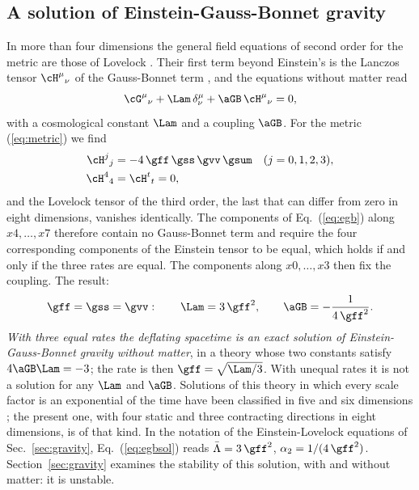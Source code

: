 \subsection{A solution of Einstein-Gauss-Bonnet gravity}
\label{sec:egb}

In more than four dimensions the general field equations of second order for the metric are those of
Lovelock \cite{Lovelock1971}. Their first term beyond Einstein's is the Lanczos tensor
$\cH^{\mu}{}_{\nu}$ of the Gauss-Bonnet term \cite{BoulwareDeser1985}, and the equations without
matter read
\begin{equation}
\cG^{\mu}{}_{\nu}+\Lam\,\delta^{\mu}_{\nu}+\aGB\,\cH^{\mu}{}_{\nu}=0,
\label{eq:egb}
\end{equation}
with a cosmological constant $\Lam$ and a coupling $\aGB$. For the metric
(\ref{eq:metric}) we find
\begin{equation}
\begin{aligned}
\cH^{j}{}_{j}&=-4\,\gff\,\gss\,\gvv\,\gsum\quad(j=0,1,2,3),\\
\cH^{4}{}_{4}&=\cH^{t}{}_{t}=0,
\end{aligned}
\label{eq:lanczos}
\end{equation}
and the Lovelock tensor of the third order, the last that can differ from zero in eight dimensions,
vanishes identically. The components of Eq.~(\ref{eq:egb}) along $x4,\dots,x7$ therefore contain no
Gauss-Bonnet term and require the four corresponding components of the Einstein tensor to be equal,
which holds if and only if the three rates are equal. The components along $x0,\dots,x3$ then fix the
coupling. The result:
\begin{equation}
\gff=\gss=\gvv:\qquad\Lam=3\,\gff^{2},\qquad\aGB=-\frac{1}{4\,\gff^{2}} .
\label{eq:egbsol}
\end{equation}
\emph{With three equal rates the deflating spacetime is an exact solution of Einstein-Gauss-Bonnet
gravity without matter}, in a theory whose two constants satisfy $4\aGB\Lam=-3$; the rate is then
$\gff=\sqrt{\Lam/3}$. With unequal rates it is not a solution for any $\Lam$ and $\aGB$. Solutions of
this theory in which every scale factor is an exponential of the time have been classified in five
and six dimensions \cite{ChirkovPavluchenkoToporensky2014}; the present one, with four static and
three contracting directions in eight dimensions, is of that kind. In the notation of the
Einstein-Lovelock equations of Sec.~\ref{sec:gravity}, Eq.~(\ref{eq:egbsol}) reads
$\bar\Lambda=3\,\gff^{2}$, $\alpha_2=1/(4\,\gff^{2})$. Section~\ref{sec:gravity} examines the
stability of this solution, with and without matter: it is unstable.

